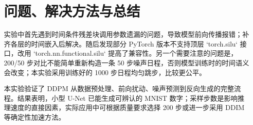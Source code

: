\documentclass[dvipsnames,svgnames,a4paper,11pt]{article}
\begin{document}
\section{问题、解决方法与总结}
实验中首先遇到时间条件残差块调用参数遗漏的问题，导致模型前向传播报错；补齐各层的时间嵌入后解决。随后发现部分 PyTorch 版本不支持顶层 `torch.silu` 接口，改用 `torch.nn.functional.silu` 提高了兼容性。另一个需要注意的问题是，200/50 步对比不能简单重新构造一条 50 步噪声日程，否则模型训练时的时间语义会改变；本实验采用训练好的 1000 步日程均匀跳步，比较更公平。

本实验验证了 DDPM 从数据预处理、前向扰动、噪声预测到反向生成的完整流程。结果表明，小型 U-Net 已能生成可辨认的 MNIST 数字；采样步数是影响推理速度的直接因素，实际应用中可根据质量要求选择 200 步或进一步采用 DDIM 等确定性加速方法。
\end{document}
